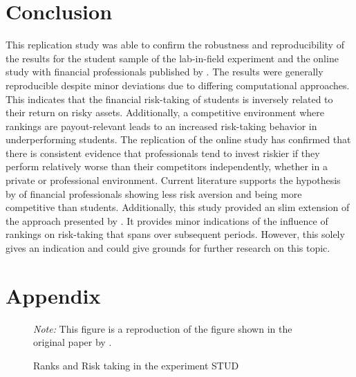 \documentclass[12pt]{article}
\newcommand{\mypathtabfig}{/Users/mirkosmit/Documents/CAU/Master_Thesis/Output}
\begin{document}
\section{Conclusion} \label{section:conclusion}
This replication study was able to confirm the robustness and reproducibility of the results for the student sample of the lab-in-field experiment and the online study with financial professionals published by \textcite{Kirchler2018}. The results were generally reproducible despite minor deviations due to differing computational approaches. This indicates that the financial risk-taking of students is inversely related to their return on risky assets. Additionally, a competitive environment where rankings are payout-relevant leads to an increased risk-taking behavior in underperforming students. The replication of the online study has confirmed that there is consistent evidence that professionals tend to invest riskier if they perform relatively worse than their competitors independently, whether in a private or professional environment. Current literature supports the hypothesis by \textcite{Kirchler2018} of financial professionals showing less risk aversion and being more competitive than students. Additionally, this study provided an slim extension of the approach presented by \textcite{Kirchler2018}. It provides minor indications of the influence of rankings on risk-taking that spans over subsequent periods. However, this solely gives an indication and could give grounds for further research on this topic.




\clearpage
\printbibliography[heading = bibintoc] 		%

\clearpage
\setcounter{secnumdepth}{0}				%
\setcounter{table}{0}						%
\renewcommand{\thetable}{A\arabic{table}}	%
\setcounter{figure}{0}						%
\renewcommand{\thefigure}{A\arabic{figure}}	%
\section{Appendix} 

\begin{figure}[h] 																		
	\caption{Ranks and Risk taking in the experiment STUD} \label{fig:linechart1}					
    	\textit{Note:} This figure is a reproduction of the figure shown in the original paper by \textcite{Kirchler2018}.
\end{figure}
\end{document}
